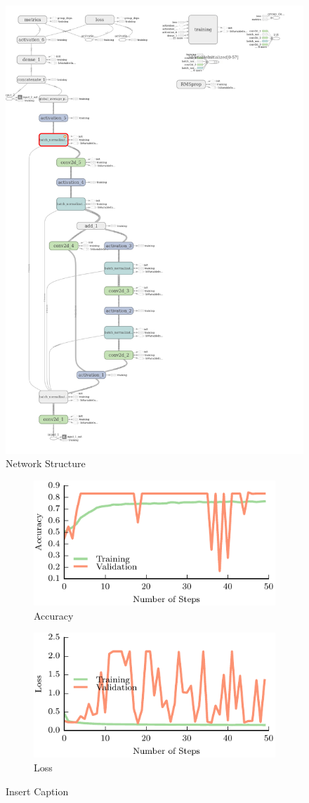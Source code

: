 \documentclass[letterpaper, 10 pt]{article}
\begin{document}
\begin{figure}[t!]
    \centering
        \includegraphics[width=0.5\columnwidth]{figs/dex_resnet.png}
    \caption{Network Structure} \label{fig:network}
\end{figure}

\begin{figure}[t!]
    \begin{subfigure}[t]{0.49\textwidth}
        \includegraphics[width=0.99\columnwidth]{figs/accuracy.pdf}
        \caption{Accuracy} \label{fig:accuracy}
        \end{subfigure}
    \begin{subfigure}[t]{0.49\textwidth}
        \includegraphics[width=0.99\columnwidth]{figs/loss.pdf}
        \caption{Loss} \label{fig:loss}
    \end{subfigure}
\caption{Insert Caption} \label{fig:results}
\end{figure}
\end{document}
